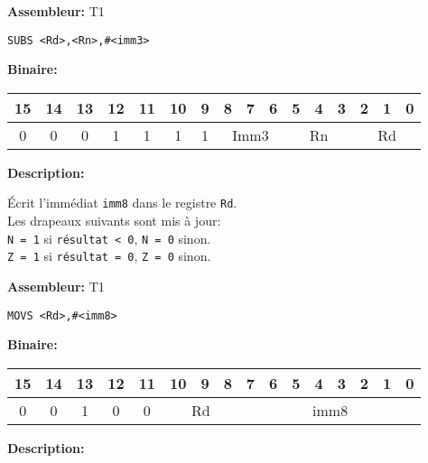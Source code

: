 \documentclass{article}
\begin{document}
    \textbf{Assembleur:} T1

    \begin{lstlisting}
SUBS <Rd>,<Rn>,#<imm3>
    \end{lstlisting}

    \textbf{Binaire:}

    \begin{tabular}{| c c c c c c c c c c c c c c c c |}
        \hline
        15 & 14 & 13 & \multicolumn{1}{|c}{12} & 11 & \multicolumn{1}{|c}{10} & \multicolumn{1}{|c}{9} & \multicolumn{1}{|c}{8} & 7 & 6 & \multicolumn{1}{|c}{5} & 4 & 3 & \multicolumn{1}{|c}{2} & 1 & 0 \\
        \hline
        0 & 0 & 0 & \multicolumn{1}{|c}{1} & 1 & \multicolumn{1}{|c}{1} & \multicolumn{1}{|c}{1} & \multicolumn{3}{|c|}{Imm3} & \multicolumn{3}{|c|}{Rn} & \multicolumn{3}{|c|}{Rd} \\
        \hline
    \end{tabular}



    \textbf{Description: }

    Écrit l'immédiat \texttt{imm8} dans le registre \texttt{Rd}.\\
    Les drapeaux suivants sont mis à jour:\\
    \texttt{N = 1} si \texttt{résultat < 0}, \texttt{N = 0} sinon.\\
    \texttt{Z = 1} si \texttt{résultat = 0}, \texttt{Z = 0} sinon.

    \textbf{Assembleur:} T1

    \begin{lstlisting}
MOVS <Rd>,#<imm8>
    \end{lstlisting}

    \textbf{Binaire:}

    \begin{tabular}{| c c c c c c c c c c c c c c c c |}
        \hline
        15 & 14 & 13 & \multicolumn{1}{|c}{12} & 11 & \multicolumn{1}{|c}{10} & 9 & 8 & \multicolumn{1}{|c}{7} & 6 & 5 & 4 & 3 & 2 & 1 & 0 \\
        \hline
        0 & 0 & 1 & \multicolumn{1}{|c}{0} & 0 & \multicolumn{3}{|c|}{Rd} & \multicolumn{8}{|c|}{imm8} \\
        \hline
    \end{tabular}


    \textbf{Description: }
\end{document}
